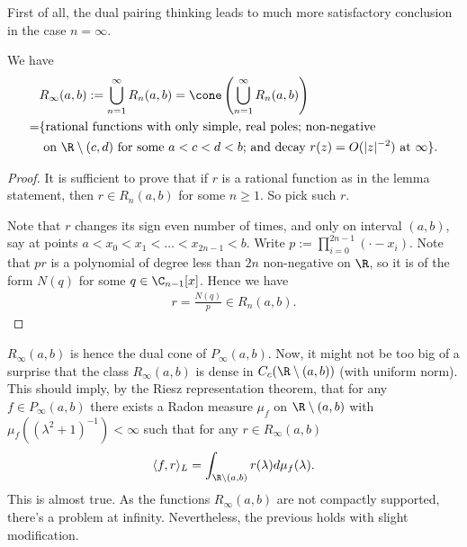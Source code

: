 First of all, the dual pairing thinking leads to much more satisfactory conclusion in the case $n = \infty$.

\begin{lem}
	We have
	\begin{align*}
		&R_{\infty}(a, b) := \bigcup_{n = 1}^{\infty} R_{n}(a, b) = \cone\left( \bigcup_{n = 1}^{\infty} R_{n}(a, b)\right) \\
		= &\{ \text{rational functions with only simple, real poles; non-negative} \\
		& \text{ on $\R \setminus (c, d)$ for some $a < c < d < b$; and decay $r(z) = O(|z|^{-2})$ at $\infty$} \}.
	\end{align*}
\end{lem}
\begin{proof}
	It is sufficient to prove that if $r$ is a rational function as in the lemma statement, then $r \in R_{n}(a, b)$ for some $n \geq 1$. So pick such $r$.

	Note that $r$ changes its sign even number of times, and only on interval $(a, b)$, say at points $a < x_{0} < x_{1} < \ldots < x_{2 n - 1} < b$. Write $p := \prod_{i = 0}^{2 n - 1} (\cdot - x_{i})$. Note that $p r$ is a polynomial of degree less than $2 n$ non-negative on $\R$, so it is of the form $N(q)$ for some $q \in \C_{n - 1}[x]$. Hence we have
	\begin{align*}
		r = \frac{N(q)}{p} \in R_{n}(a, b).
	\end{align*}
\end{proof}

$R_{\infty}(a, b)$ is hence the dual cone of $P_{\infty}(a, b)$. Now, it might not be too big of a surprise that the class $R_{\infty}(a, b)$ is dense in $C_{c}(\R \setminus (a, b))$ (with uniform norm). This should imply, by the Riesz representation theorem, that for any $f \in P_{\infty}(a, b)$ there exists a Radon measure $\mu_{f}$ on $\R \setminus (a, b)$ with $\mu_{f}((\lambda^2 + 1)^{-1}) < \infty$ such that for any $r \in R_{\infty}(a, b)$
\begin{align*}
	\langle f, r \rangle_{L} = \int_{\R \setminus (a, b)} r(\lambda) d \mu_{f}(\lambda).
\end{align*}
This is almost true. As the functions $R_{\infty}(a, b)$ are not compactly supported, there's a problem at infinity.  Nevertheless, the previous holds with slight modification.

